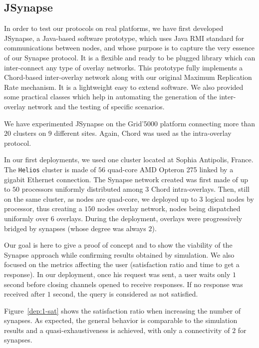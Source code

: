 
\subsection{JSynapse}

In order to test our protocols on real platforms, we have first
developed JSynapse, a Java-based software prototype, which uses Java
RMI standard for communications between nodes, and whose purpose is to
capture the very essence of our Synapse protocol. It is a flexible and
ready to be plugged library which can inter-connect any type of
overlay networks.  This prototype fully implements a Chord-based
inter-overlay network along with our original Maximum Replication Rate
mechanism. It is a lightweight easy to extend software. We also
provided some practical classes which help in automating the generation
of the inter-overlay network and the testing of specific scenarios.

We have experimented JSynapse on the Grid'5000 platform connecting
more than $20$ clusters on 9 different sites. Again, Chord was used as
the intra-overlay protocol.

In our first deployments, we used one cluster located at Sophia
Antipolis, France. The {\tt Helios} cluster is made of $56$ quad-core
AMD Opteron 275 linked by a gigabit Ethernet connection. The Synapse
network created was first made of up to $50$ processors uniformly
distributed among $3$ Chord intra-overlays. Then, still on the same
cluster, as nodes are quad-core, we deployed up to $3$ logical nodes
by processor, thus creating a $150$ nodes overlay network, nodes being
dispatched uniformly over $6$ overlays. During the deployment,
overlays were progressively bridged by synapses (whose
degree was always $2$).

Our goal is here to give a proof of concept and to show the viability
of the Synapse approach while confirming results obtained by
simulation. We also focused on the metrics affecting the user
(satisfaction ratio and time to get a response). In our deployment,
once his request was sent, a user waits only $1$ second before closing
channels opened to receive responses. If no response was received
after $1$ second, the query is considered as not satisfied.

Figure~\ref{dep:1-sat} shows the satisfaction ratio when increasing
the number of synapses. As expected, the general behavior is
comparable to the simulation results and a quasi-exhaustiveness is
achieved, with only a connectivity of $2$ for synapses.

